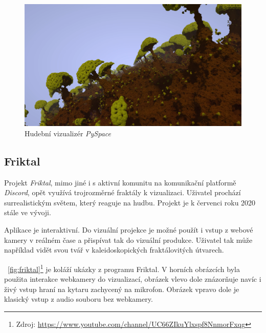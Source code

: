 \documentclass[thesis=B, czech]{FITthesis}[2019/03/06]
\begin{document}

\begin{figure}
    \centering
    \includegraphics[width=350pt]{images/3d_fractals.png}
    \caption{\label{fig:pyspace}Hudební vizualizér \textit{PySpace}}
\end{figure}

\pagebreak

\subsection*{Friktal}

Projekt \textit{Friktal}, mimo jiné i s aktivní komunitu na komunikační platformě \textit{Discord}, opět využívá trojrozměrné fraktály k vizualizaci. Uživatel prochází surrealistickým světem, který reaguje na hudbu. Projekt je k červenci roku 2020 stále ve vývoji.

Aplikace je interaktivní. Do vizuální projekce je možné použít i vstup z webové kamery v reálném čase a přispívat tak do vizuální produkce. Uživatel tak může například vidět svou tvář v kaleidoskopických fraktálovitých útvarech.

\figurename~\ref{fig:friktal}\footnote{Zdroj: \url{https://www.youtube.com/channel/UC66ZIkuYlxspf8NnmorFxqg}} je koláží ukázky z programu Friktal. V horních obrázcích byla použita interakce webkamery do vizualizací, obrázek vlevo dole znázorňuje navíc i živý vstup hraní na kytaru zachycený na mikrofon. Obrázek vpravo dole je klasický vstup z audio souboru bez webkamery.
\end{document}
